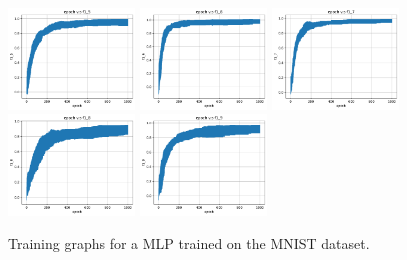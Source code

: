 \begin{figure}
    \includegraphics[width=0.30\textwidth]{figures/mnist_nn_f1_5.pdf}
    \includegraphics[width=0.30\textwidth]{figures/mnist_nn_f1_6.pdf}
    \includegraphics[width=0.30\textwidth]{figures/mnist_nn_f1_7.pdf}
    \includegraphics[width=0.30\textwidth]{figures/mnist_nn_f1_8.pdf}
    \includegraphics[width=0.30\textwidth]{figures/mnist_nn_f1_9.pdf}
    \caption{Training graphs for a MLP trained on the MNIST dataset.}
    \label{fig:mnist_nn}
\end{figure}

